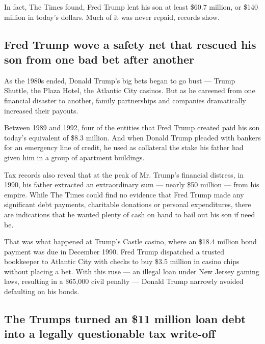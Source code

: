 In fact, The Times found, Fred Trump lent his son at least \$60.7
million, or \$140 million in today's dollars. Much of it was never
repaid, records show.

\hypertarget{fred-trump-wove-a-safety-net-that-rescued-his-son-from-one-bad-bet-after-another}{%
\subsection{Fred Trump wove a safety net that rescued his son from one
bad bet after
another}\label{fred-trump-wove-a-safety-net-that-rescued-his-son-from-one-bad-bet-after-another}}

As the 1980s ended, Donald Trump's big bets began to go bust --- Trump
Shuttle, the Plaza Hotel, the Atlantic City casinos. But as he careened
from one financial disaster to another, family partnerships and
companies dramatically increased their payouts.

Between 1989 and 1992, four of the entities that Fred Trump created paid
his son today's equivalent of \$8.3 million. And when Donald Trump
pleaded with bankers for an emergency line of credit, he used as
collateral the stake his father had given him in a group of apartment
buildings.

Tax records also reveal that at the peak of Mr. Trump's financial
distress, in 1990, his father extracted an extraordinary sum --- nearly
\$50 million --- from his empire. While The Times could find no evidence
that Fred Trump made any significant debt payments, charitable donations
or personal expenditures, there are indications that he wanted plenty of
cash on hand to bail out his son if need be.

That was what happened at Trump's Castle casino, where an \$18.4 million
bond payment was due in December 1990. Fred Trump dispatched a trusted
bookkeeper to Atlantic City with checks to buy \$3.5 million in casino
chips without placing a bet. With this ruse --- an illegal loan under
New Jersey gaming laws, resulting in a \$65,000 civil penalty --- Donald
Trump narrowly avoided defaulting on his bonds.

\hypertarget{the-trumps-turned-an-11-million-loan-debt-into-a-legally-questionable-tax-write-off}{%
\subsection{The Trumps turned an \$11 million loan debt into a legally
questionable tax
write-off}\label{the-trumps-turned-an-11-million-loan-debt-into-a-legally-questionable-tax-write-off}}

